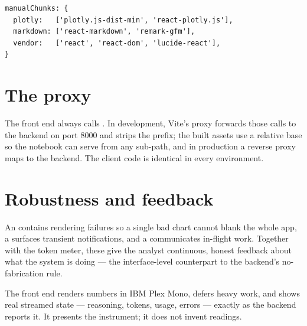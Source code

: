 \begin{lstlisting}[style=js,caption={Manual chunking keeps the initial bundle small.}]
manualChunks: {
  plotly:   ['plotly.js-dist-min', 'react-plotly.js'],
  markdown: ['react-markdown', 'remark-gfm'],
  vendor:   ['react', 'react-dom', 'lucide-react'],
}
\end{lstlisting}

\section{The  proxy}
The front end always calls . In development, Vite's proxy forwards
those calls to the backend on port 8000 and strips the  prefix; the
built assets use a relative base so the notebook can serve  from any
sub-path, and in production a reverse proxy maps  to the backend. The
client code is identical in every environment.

\section{Robustness and feedback}
An  contains rendering failures so a single bad chart cannot
blank the whole app, a  surfaces transient notifications, and a
 communicates in-flight work. Together with the token meter,
these give the analyst continuous, honest feedback about what the system is
doing --- the interface-level counterpart to the backend's no-fabrication rule.

\begin{uanote}
The front end renders numbers in IBM Plex Mono, defers heavy work, and shows
real streamed state --- reasoning, tokens, usage, errors --- exactly as the
backend reports it. It presents the instrument; it does not invent readings.
\end{uanote}

